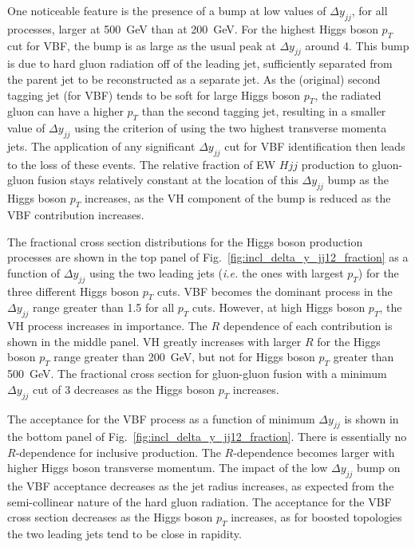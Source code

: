 \documentclass[10pt,prd,fleqn,superscriptaddress,notitlepage,nofootinbib,preprintnumbers,nobalancelastpage]{revtex4-1}
\newcommand{\VBF}{VBF\xspace}
\newcommand{\VH}{VH\xspace}
\begin{document}
One noticeable feature is the presence of a bump at low values of $\Delta y_{jj}$, for all processes,  larger at 500~GeV than at 200~GeV. For the highest Higgs boson $p_T$ cut for \VBF, the bump is as large as the usual peak at $\Delta y_{jj}$ around 4. This bump is due to hard gluon radiation off of the leading jet, sufficiently separated from the parent jet to be reconstructed as a separate jet. As the (original) second tagging jet (for \VBF) tends to be soft for large Higgs boson $p_T$, the radiated gluon can have a higher $p_T$ than the second tagging jet, resulting in a smaller value of $\Delta y_{jj}$ using the criterion of using the two highest transverse momenta jets. The application of any significant $\Delta y_{jj}$ cut for \VBF identification then leads to the loss of these events. The relative fraction of EW $Hjj$ production to gluon-gluon fusion stays relatively constant  at the location of this $\Delta y_{jj}$ bump as the Higgs boson $p_T$ increases, as the \VH component of the bump is reduced as the \VBF contribution increases.

The fractional cross section distributions for the Higgs boson production processes are shown in the top panel of Fig.~\ref{fig:incl_delta_y_jj12_fraction} as a function of $\Delta y_{jj}$ using the two leading jets (\emph{i.e.} the ones with largest $p_T$) for the three different Higgs boson $p_T$ cuts. \VBF becomes the dominant process in the $\Delta y_{jj}$ range greater than 1.5 for all $p_T$ cuts. However, at high Higgs boson $p_T$, the \VH process increases in importance. The $R$ dependence of each contribution is shown in the middle panel. \VH greatly increases with larger $R$ for the Higgs boson $p_T$ range greater than 200~GeV, but not for Higgs boson $p_T$ greater than 500~GeV.
The fractional cross section for gluon-gluon fusion with a minimum $\Delta y_{jj}$ cut of 3 decreases as the Higgs boson $p_T$ increases.

The acceptance for the \VBF process as a function of minimum $\Delta y_{jj}$ is shown in the bottom panel of Fig.~\ref{fig:incl_delta_y_jj12_fraction}. There is essentially no $R$-dependence for inclusive production. The $R$-dependence becomes larger with higher Higgs boson transverse momentum. The impact of the low $\Delta y_{jj}$ bump on the \VBF acceptance decreases as the jet radius increases, as expected from the semi-collinear nature of the hard gluon radiation.
The acceptance for the \VBF cross section decreases as the Higgs boson $p_T$ increases, as for boosted topologies the two leading jets tend to be close in rapidity.
\end{document}

